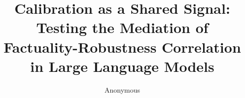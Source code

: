 \documentclass{article}
\title{Calibration as a Shared Signal: Testing the Mediation of Factuality-Robustness Correlation in Large Language Models}
\author{Anonymous}
\date{}
\begin{document}
\maketitle

\begin{abstract}

\end{abstract}











\end{document}
